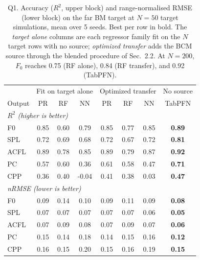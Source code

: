 \begin{table}[htbp]
\centering
\small
\caption{Q1. Accuracy ($R^2$, upper block) and range-normalised RMSE (lower block) on the far BM target at $N=50$ target simulations, mean over 5 seeds. Best per row in bold. The \emph{target alone} columns are each regressor family fit on the $N$ target rows with no source; \emph{optimized transfer} adds the BCM source through the blended procedure of Sec.~2.2. At $N=200$, $F_0$ reaches 0.75 (RF alone), 0.84 (RF transfer), and 0.92 (TabPFN).}
\label{tab:q1}
\begin{tabular}{l|ccc|ccc|c}
\toprule
& \multicolumn{3}{c|}{Fit on target alone} & \multicolumn{3}{c|}{Optimized transfer} & No source \\
Output & PR & RF & NN & PR & RF & NN & TabPFN \\
\midrule
\multicolumn{8}{l}{\textit{$R^2$ (higher is better)}} \\
F0 & 0.85 & 0.60 & 0.79 & 0.85 & 0.77 & 0.85 & \textbf{0.89} \\
SPL & 0.72 & 0.69 & 0.68 & 0.72 & 0.67 & 0.72 & \textbf{0.81} \\
ACFL & 0.89 & 0.78 & 0.85 & 0.89 & 0.79 & 0.87 & \textbf{0.92} \\
PC & 0.57 & 0.60 & 0.36 & 0.61 & 0.58 & 0.47 & \textbf{0.71} \\
CPP & 0.36 & 0.40 & -0.04 & 0.41 & 0.38 & 0.03 & \textbf{0.47} \\
\midrule
\multicolumn{8}{l}{\textit{nRMSE (lower is better)}} \\
F0 & 0.09 & 0.14 & 0.10 & 0.09 & 0.11 & 0.09 & \textbf{0.08} \\
SPL & 0.07 & 0.07 & 0.07 & 0.07 & 0.07 & 0.06 & \textbf{0.05} \\
ACFL & 0.07 & 0.09 & 0.08 & 0.07 & 0.09 & 0.07 & \textbf{0.06} \\
PC & 0.15 & 0.14 & 0.18 & 0.14 & 0.15 & 0.16 & \textbf{0.12} \\
CPP & 0.16 & 0.15 & 0.20 & 0.15 & 0.16 & 0.19 & \textbf{0.15} \\
\bottomrule
\end{tabular}
\end{table}

